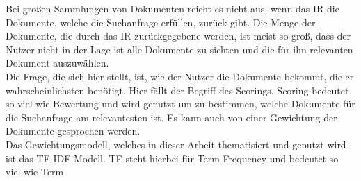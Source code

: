 Bei großen Sammlungen von Dokumenten reicht es nicht aus, wenn das IR die Dokumente, welche die Suchanfrage erfüllen, zurück gibt. Die Menge der Dokumente, die durch das IR zurückgegebene werden, ist meist so groß, dass der Nutzer nicht in der Lage ist alle Dokumente zu sichten und die für ihn relevanten Dokument auszuwählen.\\
Die Frage, die sich hier stellt, ist, wie der Nutzer die Dokumente bekommt, die er wahrscheinlichsten benötigt. Hier fällt der Begriff des Scorings. Scoring bedeutet so viel wie Bewertung und wird genutzt um zu bestimmen, welche Dokumente für die Suchanfrage am relevantesten ist. Es kann auch von einer Gewichtung der Dokumente gesprochen werden.\\
Das Gewichtungsmodell, welches in dieser Arbeit thematisiert und genutzt wird ist das TF-IDF-Modell. TF steht hierbei für Term Frequency und bedeutet so viel wie Term 